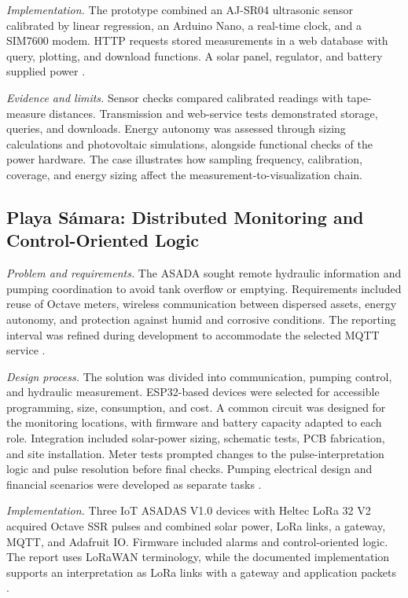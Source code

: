 \documentclass[conference]{IEEEtran}
\begin{document}
\emph{Implementation.} The prototype combined an AJ-SR04 ultrasonic sensor calibrated by linear regression, an Arduino Nano, a real-time clock, and a SIM7600 modem. HTTP requests stored measurements in a web database with query, plotting, and download functions. A solar panel, regulator, and battery supplied power \cite[Secs.~5.2--5.6]{chavarria2021implementacion}.

\emph{Evidence and limits.} Sensor checks compared calibrated readings with tape-measure distances. Transmission and web-service tests demonstrated storage, queries, and downloads. Energy autonomy was assessed through sizing calculations and photovoltaic simulations, alongside functional checks of the power hardware. The case illustrates how sampling frequency, calibration, coverage, and energy sizing affect the measurement-to-visualization chain.

\subsection{Playa S\'{a}mara: Distributed Monitoring and Control-Oriented Logic}

\emph{Problem and requirements.} The ASADA sought remote hydraulic information and pumping coordination to avoid tank overflow or emptying. Requirements included reuse of Octave meters, wireless communication between dispersed assets, energy autonomy, and protection against humid and corrosive conditions. The reporting interval was refined during development to accommodate the selected MQTT service \cite[Secs.~1.3 and 2.1]{solorzano2021sistema}.

\emph{Design process.} The solution was divided into communication, pumping control, and hydraulic measurement. ESP32-based devices were selected for accessible programming, size, consumption, and cost. A common circuit was designed for the monitoring locations, with firmware and battery capacity adapted to each role. Integration included solar-power sizing, schematic tests, PCB fabrication, and site installation. Meter tests prompted changes to the pulse-interpretation logic and pulse resolution before final checks. Pumping electrical design and financial scenarios were developed as separate tasks \cite[Chs.~5--8]{solorzano2021sistema}.

\emph{Implementation.} Three IoT ASADAS V1.0 devices with Heltec LoRa 32 V2 acquired Octave SSR pulses and combined solar power, LoRa links, a gateway, MQTT, and Adafruit IO. Firmware included alarms and control-oriented logic. The report uses LoRaWAN terminology, while the documented implementation supports an interpretation as LoRa links with a gateway and application packets \cite[Chs.~4--6]{solorzano2021sistema}.
\end{document}
